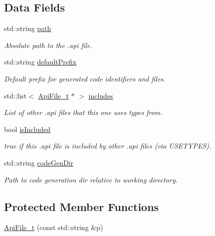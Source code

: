 \subsection*{Data Fields}
\begin{DoxyCompactItemize}
\item 
std\+::string \hyperlink{structmodel_1_1_api_file__t_a98cdd189e475f550e6ca72a2295a29a7}{path}
\begin{DoxyCompactList}\small\item\em Absolute path to the .api file. \end{DoxyCompactList}\item 
std\+::string \hyperlink{structmodel_1_1_api_file__t_a51421c49c4e2ee0da6c6a13ef2aea4c5}{default\+Prefix}
\begin{DoxyCompactList}\small\item\em Default prefix for generated code identifiers and files. \end{DoxyCompactList}\item 
std\+::list$<$ \hyperlink{structmodel_1_1_api_file__t}{Api\+File\+\_\+t} $\ast$ $>$ \hyperlink{structmodel_1_1_api_file__t_a711ebebdd7b82d7ed8ca6874f9b1ff32}{includes}
\begin{DoxyCompactList}\small\item\em List of other .api files that this one uses types from. \end{DoxyCompactList}\item 
bool \hyperlink{structmodel_1_1_api_file__t_ab80e4d9268b8c5415ccf0cb708852488}{is\+Included}
\begin{DoxyCompactList}\small\item\em true if this .api file is included by other .api files (via U\+S\+E\+T\+Y\+P\+ES). \end{DoxyCompactList}\item 
std\+::string \hyperlink{structmodel_1_1_api_file__t_a6bcef976a865a4a1e46edf43ab769afd}{code\+Gen\+Dir}
\begin{DoxyCompactList}\small\item\em Path to code generation dir relative to working directory. \end{DoxyCompactList}\end{DoxyCompactItemize}
\subsection*{Protected Member Functions}
\begin{DoxyCompactItemize}
\item 
\hyperlink{structmodel_1_1_api_file__t_a6854b55941333bc3ba3760f7899737f0}{Api\+File\+\_\+t} (const std\+::string \&p)
\end{DoxyCompactItemize}
